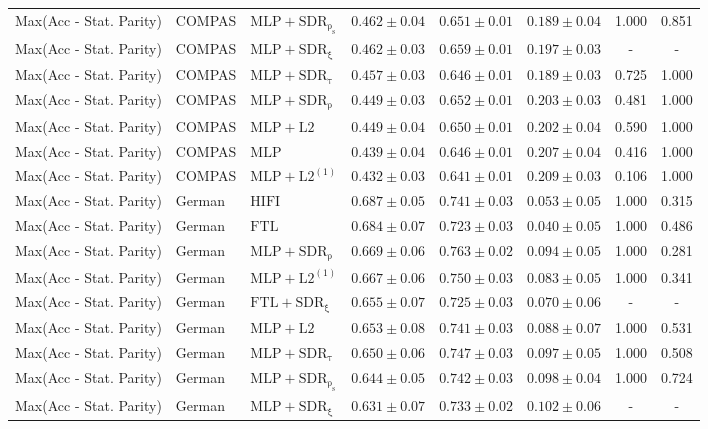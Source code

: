 \begin{table}[htbp]
\begin{tabular}{lllccccc}
Max(Acc - Stat. Parity) & COMPAS & $\mathrm{MLP+SDR_{\rho_s}}$ & $0.462 \pm0.04$ & $0.651 \pm0.01$ & $0.189 \pm0.04$ & 1.000 & 0.851 \\
Max(Acc - Stat. Parity) & COMPAS & $\mathrm{MLP+SDR_{\xi}}$ & $0.462 \pm0.03$ & $0.659 \pm0.01$ & $0.197 \pm0.03$ & - & - \\
Max(Acc - Stat. Parity) & COMPAS & $\mathrm{MLP+SDR_{\tau}}$ & $0.457 \pm0.03$ & $0.646 \pm0.01$ & $0.189 \pm0.03$ & 0.725 & 1.000 \\
Max(Acc - Stat. Parity) & COMPAS & $\mathrm{MLP+SDR_{\rho}}$ & $0.449 \pm0.03$ & $0.652 \pm0.01$ & $0.203 \pm0.03$ & 0.481 & 1.000 \\
Max(Acc - Stat. Parity) & COMPAS & $\mathrm{MLP+L2}$ & $0.449 \pm0.04$ & $0.650 \pm0.01$ & $0.202 \pm0.04$ & 0.590 & 1.000 \\
Max(Acc - Stat. Parity) & COMPAS & $\mathrm{MLP}$ & $0.439 \pm0.04$ & $0.646 \pm0.01$ & $0.207 \pm0.04$ & 0.416 & 1.000 \\
Max(Acc - Stat. Parity) & COMPAS & $\mathrm{MLP+L2^{(1)}}$ & $0.432 \pm0.03$ & $0.641 \pm0.01$ & $0.209 \pm0.03$ & 0.106 & 1.000 \\
Max(Acc - Stat. Parity) & German & $\mathrm{HIFI}$ & $0.687 \pm0.05$ & $0.741 \pm0.03$ & $0.053 \pm0.05$ & 1.000 & 0.315 \\
Max(Acc - Stat. Parity) & German & $\mathrm{FTL}$ & $0.684 \pm0.07$ & $0.723 \pm0.03$ & $0.040 \pm0.05$ & 1.000 & 0.486 \\
Max(Acc - Stat. Parity) & German & $\mathrm{MLP+SDR_{\rho}}$ & $0.669 \pm0.06$ & $0.763 \pm0.02$ & $0.094 \pm0.05$ & 1.000 & 0.281 \\
Max(Acc - Stat. Parity) & German & $\mathrm{MLP+L2^{(1)}}$ & $0.667 \pm0.06$ & $0.750 \pm0.03$ & $0.083 \pm0.05$ & 1.000 & 0.341 \\
Max(Acc - Stat. Parity) & German & $\mathrm{FTL+SDR_{\xi}}$ & $0.655 \pm0.07$ & $0.725 \pm0.03$ & $0.070 \pm0.06$ & - & - \\
Max(Acc - Stat. Parity) & German & $\mathrm{MLP+L2}$ & $0.653 \pm0.08$ & $0.741 \pm0.03$ & $0.088 \pm0.07$ & 1.000 & 0.531 \\
Max(Acc - Stat. Parity) & German & $\mathrm{MLP+SDR_{\tau}}$ & $0.650 \pm0.06$ & $0.747 \pm0.03$ & $0.097 \pm0.05$ & 1.000 & 0.508 \\
Max(Acc - Stat. Parity) & German & $\mathrm{MLP+SDR_{\rho_s}}$ & $0.644 \pm0.05$ & $0.742 \pm0.03$ & $0.098 \pm0.04$ & 1.000 & 0.724 \\
Max(Acc - Stat. Parity) & German & $\mathrm{MLP+SDR_{\xi}}$ & $0.631 \pm0.07$ & $0.733 \pm0.02$ & $0.102 \pm0.06$ & - & - \\

\end{tabular}
\end{table}
